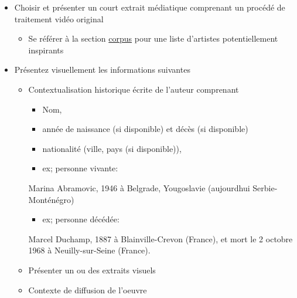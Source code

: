 \documentclass[
  french,
]{book}
\newenvironment{Shaded}{\begin{snugshade}}{\end{snugshade}}
\newcommand{\NormalTok}[1]{#1}
\providecommand{\tightlist}{%
  \setlength{\itemsep}{0pt}\setlength{\parskip}{0pt}}
\begin{document}
\begin{itemize}
\tightlist
\item
  Choisir et présenter un court extrait médiatique comprenant un procédé de traitement vidéo original

  \begin{itemize}
  \tightlist
  \item
    Se référer à la section \protect\hyperlink{corpus}{corpus} pour une liste d'artistes potentiellement inspirants
  \end{itemize}
\item
  Présentez visuellement les informations suivantes

  \begin{itemize}
  \tightlist
  \item
    Contextualisation historique écrite de l'auteur comprenant

    \begin{itemize}
    \tightlist
    \item
      Nom,
    \item
      année de naissance (si disponible) et décès (si disponible)
    \item
      nationalité (ville, pays (si disponible)),
    \item
      ex; personne vivante:
    \end{itemize}

\begin{Shaded}
\begin{Highlighting}[]
\NormalTok{Marina Abramovic, 1946 à Belgrade, Yougoslavie (aujourd\textquotesingle{}hui Serbie{-}Monténégro)}
\end{Highlighting}
\end{Shaded}

    \begin{itemize}
    \tightlist
    \item
      ex; personne décédée:
    \end{itemize}

\begin{Shaded}
\begin{Highlighting}[]
\NormalTok{Marcel Duchamp, 1887 à Blainville{-}Crevon (France), et mort le 2 octobre 1968 à Neuilly{-}sur{-}Seine (France).}
\end{Highlighting}
\end{Shaded}
  \item
    Présenter un ou des extraits visuels
  \item
    Contexte de diffusion de l'oeuvre


\end{itemize}
\end{itemize}
\end{document}
